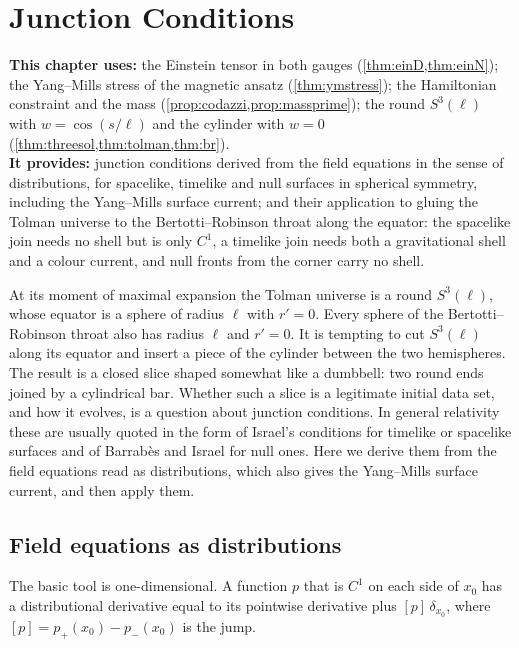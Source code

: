 \chapter{Junction Conditions}
\label{ch:junctions}

\begin{usesbox}
\textbf{This chapter uses:} the Einstein tensor in both gauges (\cref{thm:einD,thm:einN}); the Yang--Mills stress of the magnetic ansatz (\cref{thm:ymstress}); the Hamiltonian constraint and the mass (\cref{prop:codazzi,prop:massprime}); the round $S^3(\ell)$ with $w=\cos(s/\ell)$ and the cylinder with $w=0$ (\cref{thm:threesol,thm:tolman,thm:br}).\\
\textbf{It provides:} junction conditions derived from the field equations in the sense of distributions, for spacelike, timelike and null surfaces in spherical symmetry, including the Yang--Mills surface current; and their application to gluing the Tolman universe to the Bertotti--Robinson throat along the equator: the spacelike join needs no shell but is only $C^1$, a timelike join needs both a gravitational shell and a colour current, and null fronts from the corner carry no shell.
\end{usesbox}

At its moment of maximal expansion the Tolman universe is a round $S^3(\ell)$, whose equator is a sphere of radius $\ell$ with $r'=0$. Every sphere of the Bertotti--Robinson throat also has radius $\ell$ and $r'=0$. It is tempting to cut $S^3(\ell)$ along its equator and insert a piece of the cylinder between the two hemispheres. The result is a closed slice shaped somewhat like a dumbbell: two round ends joined by a cylindrical bar. Whether such a slice is a legitimate initial data set, and how it evolves, is a question about junction conditions. In general relativity these are usually quoted in the form of Israel's conditions \cite{Israel1966} for timelike or spacelike surfaces and of Barrab\`es and Israel \cite{BarrabesIsrael1991} for null ones. Here we derive them from the field equations read as distributions, which also gives the Yang--Mills surface current, and then apply them.

\section{Field equations as distributions}

The basic tool is one-dimensional. A function $p$ that is $C^1$ on each side of $x_0$ has a distributional derivative equal to its pointwise derivative plus $[p]\,\delta_{x_0}$, where $[p]=p_+(x_0)-p_-(x_0)$ is the jump.

